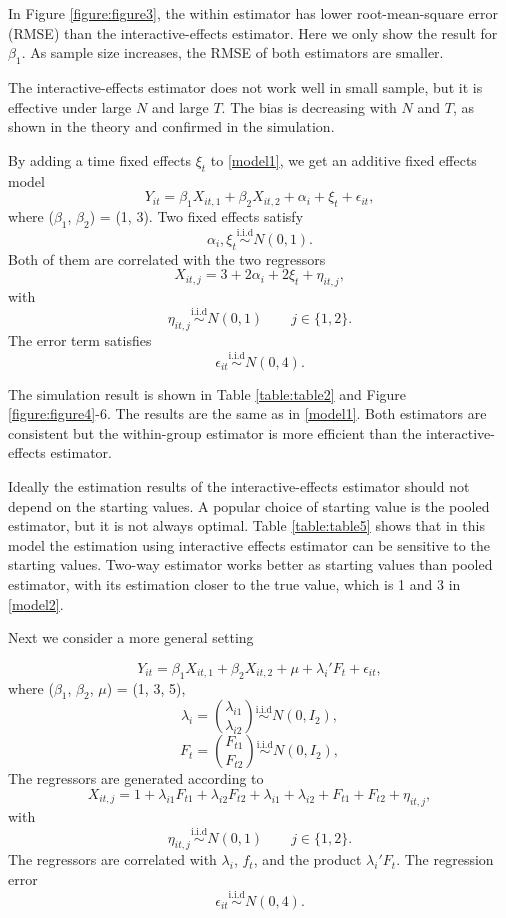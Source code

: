\documentclass[a4paper]{article}
\begin{document}
In Figure \ref{figure:figure3}, the within estimator has lower root-mean-square error (RMSE) than the interactive-effects estimator. Here we only show the result for $\beta_1$. As sample size increases, the RMSE of both estimators are smaller.

The interactive-effects estimator does not work well in small sample, but it is effective under large $N$ and large $T$. The bias is decreasing with $N$ and $T$, as shown in the theory and confirmed in the simulation.

By adding a time fixed effects $\xi_{t}$ to  \eqref{model1}, we get an additive fixed effects model
\begin{equation}\label{model2}
    Y_{it} = \beta_{1}X_{it,1}+\beta_{2}X_{it,2}+\alpha_{i}+\xi_{t}+\epsilon_{it},
\end{equation}
where ($\beta_1$, $\beta_2$) = (1, 3). Two fixed effects satisfy $$\alpha_{i}, \xi_{t}\stackrel{\text{i.i.d}}{\sim}N(0,1).$$ Both of them are correlated with the two regressors
\[
    X_{it,j}=3+2\alpha_i+2\xi_t+\eta_{it,j},
\] with
\[
    \eta_{it,j}\stackrel{\text{i.i.d}}{\sim} N(0,1) \qquad j\in \{1,2\}.
\] The error term satisfies $$\epsilon_{it}\stackrel{\text{i.i.d}}{\sim} N(0,4).$$

The simulation result is shown in Table \ref{table:table2} and Figure \ref{figure:figure4}-6. The results are the same as in \eqref{model1}. Both estimators are consistent but the within-group
estimator is more efficient than the interactive-effects estimator.

Ideally the estimation results of the interactive-effects estimator should not depend on the starting values. A popular choice of starting value is the pooled estimator, but it is not always optimal. Table \ref{table:table5} shows that in this model the estimation using interactive effects estimator can be sensitive to the starting values. Two-way estimator works better as starting values than pooled estimator, with its estimation closer to the true value, which is 1 and 3 in  \eqref{model2}.

Next we consider a more general setting

\begin{equation}\label{model3}
    Y_{it} = \beta_{1}X_{it,1}+\beta_{2}X_{it,2}+ \mu+\lambda_{i}'F_{t}+\epsilon_{it},
\end{equation}
where ($\beta_1$, $\beta_2$, $\mu$) = (1, 3, 5),
\[
    \lambda_i = \binom{\lambda_{i1}}{\lambda_{i2}} \stackrel{\text{i.i.d}}{\sim} N(0,I_2),
\]
\[
    F_t =\binom{F_{t1}}{F_{t2}}\stackrel{\text{i.i.d}}{\sim}  N(0,I_2),
\]
The regressors are generated according to
 $$X_{it,j}= 1+\lambda_{i1}F_{t1}+\lambda_{i2}F_{t2}+\lambda_{i1}+\lambda_{i2}+F_{t1}+F_{t2}+\eta_{it,j},$$
 with $$\eta_{it,j}\stackrel{\text{i.i.d}}{\sim} N(0,1) \qquad j\in \{1,2\}.$$ The regressors are correlated with $\lambda_i$, $f_t$, and the product $ \lambda_i' F_t$. The regression error $$\epsilon_{it} \stackrel{\text{i.i.d}}{\sim}N(0,4).$$
\end{document}

